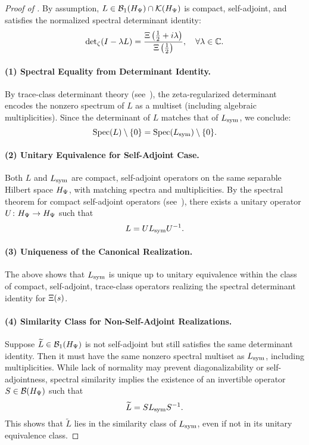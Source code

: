 \begin{proof}[Proof of ]
By assumption, \( L \in \mathcal{B}_1(H_{\Psi}) \cap \mathcal{K}(H_{\Psi}) \) is compact, self-adjoint, and satisfies the normalized spectral determinant identity:
\[
\det\nolimits_\zeta(I - \lambda L) = \frac{\Xi\left(\tfrac{1}{2} + i\lambda\right)}{\Xi\left(\tfrac{1}{2}\right)}, \quad \forall \lambda \in \mathbb{C}.
\]

\paragraph{(1) Spectral Equality from Determinant Identity.}
By trace-class determinant theory (see~\cite[Theorem~4.2]{Simon2005TraceIdeals}), the zeta-regularized determinant encodes the nonzero spectrum of \( L \) as a multiset (including algebraic multiplicities). Since the determinant of \( L \) matches that of \( L_{\mathrm{sym}} \), we conclude:
\[
\operatorname{Spec}(L) \setminus \{0\} = \operatorname{Spec}(L_{\mathrm{sym}}) \setminus \{0\}.
\]

\paragraph{(2) Unitary Equivalence for Self-Adjoint Case.}
Both \( L \) and \( L_{\mathrm{sym}} \) are compact, self-adjoint operators on the same separable Hilbert space \( H_{\Psi} \), with matching spectra and multiplicities. By the spectral theorem for compact self-adjoint operators (see~\cite[Theorem~VI.16]{ReedSimon1980I}), there exists a unitary operator \( U \colon H_{\Psi} \to H_{\Psi} \) such that
\[
L = U L_{\mathrm{sym}} U^{-1}.
\]

\paragraph{(3) Uniqueness of the Canonical Realization.}
The above shows that \( L_{\mathrm{sym}} \) is unique up to unitary equivalence within the class of compact, self-adjoint, trace-class operators realizing the spectral determinant identity for \( \Xi(s) \).

\paragraph{(4) Similarity Class for Non-Self-Adjoint Realizations.}
Suppose \( \widetilde{L} \in \mathcal{B}_1(H_{\Psi}) \) is not self-adjoint but still satisfies the same determinant identity. Then it must have the same nonzero spectral multiset as \( L_{\mathrm{sym}} \), including multiplicities. While lack of normality may prevent diagonalizability or self-adjointness, spectral similarity implies the existence of an invertible operator \( S \in \mathcal{B}(H_{\Psi}) \) such that
\[
\widetilde{L} = S L_{\mathrm{sym}} S^{-1}.
\]
This shows that \( \widetilde{L} \) lies in the similarity class of \( L_{\mathrm{sym}} \), even if not in its unitary equivalence class.


\end{proof}
